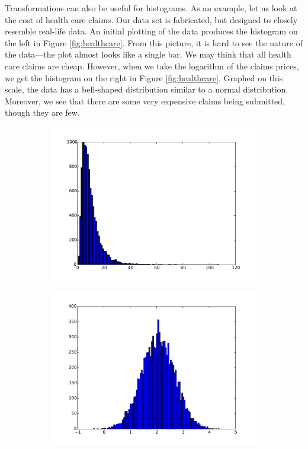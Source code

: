 Transformations can also be useful for histograms.
As an example, let us look at the cost of health care claims. 
Our data set is fabricated, but designed to closely resemble real-life data. 
An initial plotting of the data produces the histogram on the left in Figure \ref{fig:healthcare}. 
From this picture, it is hard to see the nature of the data---the plot almost looks like a single bar. 
We may think that all health care claims are cheap. 
However, when we take the logarithm of the claims prices, we get the histogram on the right in Figure \ref{fig:healthcare}. 
Graphed on this scale, the data has a bell-shaped distribution similar to a normal distribution. 
Moreover, we see that there are some very expensive claims being submitted, though they are few. 
\begin{figure}
\centering
\begin{subfigure}{.5\textwidth}
  \centering
  \includegraphics[width=\textwidth]{healthcare_linscale.pdf}
\end{subfigure}%
\begin{subfigure}{.5\textwidth}
  \centering
  \includegraphics[width=\textwidth]{healthcare_logscale.pdf}

\end{subfigure}
\end{figure}
